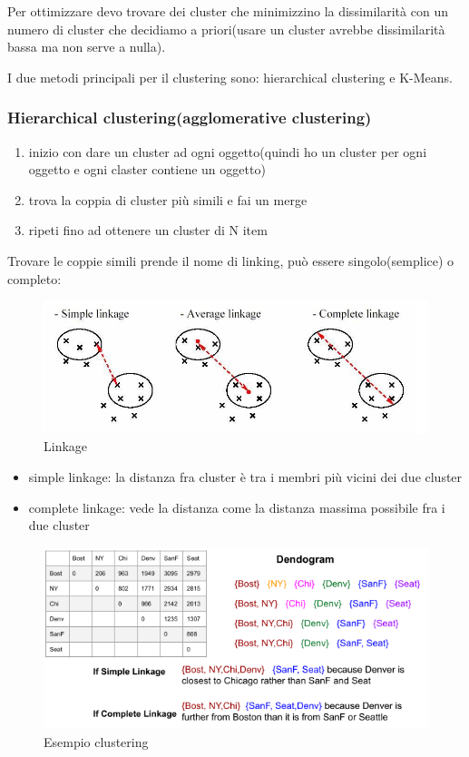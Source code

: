 Per ottimizzare devo trovare dei cluster che minimizzino la dissimilarità con un numero
di cluster che decidiamo a priori(usare un cluster avrebbe dissimilarità bassa ma  non serve a
nulla).

I due metodi principali per il clustering sono: hierarchical clustering e K-Means.


\subsubsection{Hierarchical clustering(agglomerative clustering)}

\begin{enumerate}
    \item inizio con dare un cluster ad ogni oggetto(quindi ho un cluster per ogni oggetto e ogni claster contiene un oggetto)
    \item trova la coppia di cluster più simili e fai un merge
    \item ripeti fino ad ottenere un cluster di N item
\end{enumerate}

Trovare le coppie simili prende il nome di linking,
può essere singolo(semplice) o completo:
\begin{figure}[H]
    \centering
    \includegraphics[width=0.6\linewidth]{imgs/linkag}
    \caption{Linkage}
    \label{fig:Linkage}
\end{figure}
\begin{itemize}
    \item simple linkage: la distanza fra cluster è tra i membri più vicini dei due cluster
    \item complete linkage: vede la distanza come la distanza massima possibile fra i due cluster
\end{itemize}


\begin{figure}[H]
    \centering
    \includegraphics[width=0.6\linewidth]{imgs/esempio-clustering}
    \caption{Esempio clustering}
    \label{fig:Esempio-clustering}
\end{figure}


